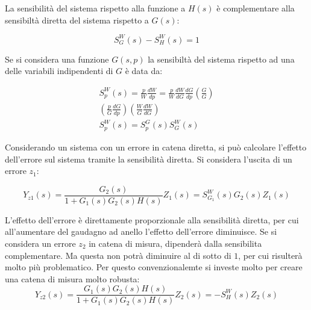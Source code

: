 \documentclass{article}
\numberwithin{equation}{subsection}
\begin{document}
La sensibilità del sistema rispetto alla funzione a $H(s)$ è complementare alla sensibiltà diretta del sistema rispetto a $G(s)$:

\begin{equation}
    S^W_G(s)-S^W_H(s)=1
\end{equation}

Se si considera una funzione $G(s,p)$ la sensibiltà del sistema rispetto ad una delle variabili indipendenti di $G$ è data da:

\begin{gather}
    S^W_p(s)=\displaystyle\frac{p}{W}\frac{dW}{dp}=\frac{p}{W}\frac{dW}{dG}\frac{dG}{dp}\left(\frac{G}{G}\right)\\
    \left(\frac{p}{G}\frac{dG}{dp}\right)\left(\frac{W}{G}\frac{dW}{dG}\right)\\
    S^W_p(s)=S^G_p(s)S^W_G(s)
\end{gather}

Considerando un sistema con un errore in catena diretta, si può calcolare l'effetto dell'errore sul sistema tramite la sensibilità diretta. Si considera l'uscita 
di un errore $z_1$:

\begin{equation}
    Y_{z1}(s)=\displaystyle\frac{G_2(s)}{1+G_1(s)G_2(s)H(s)}Z_1(s)=S^W_{G_1}(s)G_2(s)Z_1(s)
\end{equation}

L'effetto dell'errore è direttamente proporzionale alla sensibilità diretta, per cui all'aumentare del gaudagno ad anello l'effetto dell'errore diminuisce.  
Se si considera un errore $z_2$ in catena di misura, dipenderà dalla sensibilita complementare. Ma questa non potrà diminuire al di sotto di $1$, per cui risulterà molto più 
problematico. Per questo convenzionalemte si investe molto per creare una catena di misura molto robusta: 
\begin{equation}
    Y_{z2}(s)=\displaystyle\frac{G_1(s)G_2(s)H(s)}{1+G_1(s)G_2(s)H(s)}Z_2(s)=-S^W_H(s)Z_2(s)
\end{equation}
\end{document}
